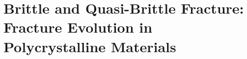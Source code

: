 \chapter{Brittle and Quasi-Brittle Fracture: Fracture Evolution in Polycrystalline Materials}
\label{chapter: brittle}








